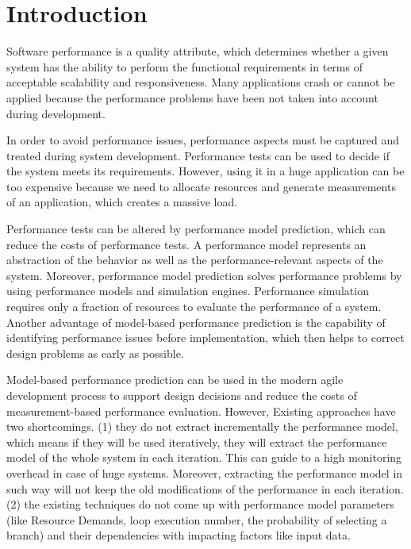 
\chapter{Introduction}
\label{ch:Introduction}


Software performance is a quality attribute, which determines whether a given system has the ability to perform the functional requirements in terms of acceptable scalability and responsiveness. Many applications crash or cannot be applied because the performance problems have been not taken into account during development. 

In order to avoid performance issues, performance aspects must be captured and treated during system development. Performance tests can be used to decide if the system meets its requirements. However, using it in a huge application can be too expensive because we need to allocate resources and generate measurements of an application, which creates a massive load. 

Performance tests can be altered by performance model prediction, which can reduce the costs of performance tests. A performance model represents an abstraction of the behavior as well as the performance-relevant aspects of the system. Moreover, performance model prediction solves performance problems by using performance models and simulation engines. Performance simulation requires only a fraction of resources to evaluate the performance of a system. Another advantage of model-based performance prediction is the capability of identifying performance issues before implementation, which then helps to correct design problems as early as possible. 

Model-based performance prediction can be used in the modern agile development process to support design decisions and reduce the costs of measurement-based performance evaluation. However, Existing approaches have two shortcomings. (1) they do not extract incrementally the performance model, which means if they will be used iteratively, they will extract the performance model of the whole system in each iteration. This can guide to a high monitoring overhead in case of huge systems. Moreover, extracting the performance model in such way will not keep the old modifications of the performance in each iteration.  (2) the existing techniques do not come up with performance model parameters (like Resource Demands, loop execution number, the probability of selecting a branch) and their dependencies with impacting factors like input data.

